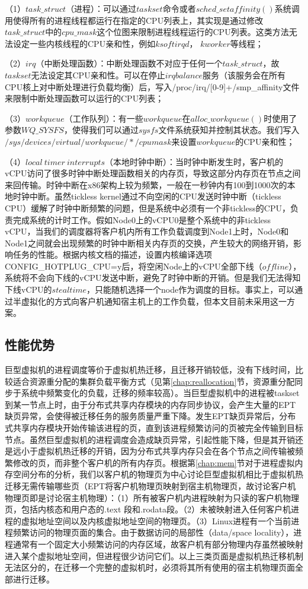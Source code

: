 （1）$task\_struct$（进程）：可以通过$taskset$命令或者$sched\_setaffinity()$系统调用使得所有的进程线程都运行在指定的CPU列表上，其实现是通过修改$task\_struct$中的$cpu\_mask$这个位图来限制进程线程运行的CPU列表。这类方法无法设定一些内核线程的CPU亲和性，例如$ksoftirqd$， $kworker$等线程；

（2）$irq$（中断处理函数）：中断处理函数不对应于任何一个$task\_struct$，故$taskset$无法设定其CPU亲和性。可以在停止$irqbalance$服务（该服务会在所有CPU核上对中断处理进行负载均衡）后，写入/proc/irq/[0-9]+/smp\_affinity文件来限制中断处理函数可以运行的CPU列表；

（3）$workqueue$（工作队列）：有一些$workqueue$在$alloc\_workqueue()$时使用了参数$WQ\_SYSFS$，使得我们可以通过$sysfs$文件系统获知并控制其状态。我们写入$/sys/devices/virtual/workqueue/*/cpumask$来设置$workqueue$的CPU亲和性；

（4）$local\ timer\ interrupts$（本地时钟中断）：当时钟中断发生时，客户机的vCPU访问了很多时钟中断处理函数相关的内存页，导致这部分内存页在节点之间来回传输。时钟中断在x86架构上较为频繁，一般在一秒钟内有100到1000次的本地时钟中断。虽然tickless kernel通过不向空闲的CPU发送时钟中断（tickless CPU）缓解了时钟中断频繁的问题，但是系统中必须有一个非tickless的CPU，负责完成系统的计时工作。假如Node0上的vCPU0是整个系统中的非tickless vCPU，当我们的调度器将客户机内所有工作负载调度到Node1上时，Node0和Node1之间就会出现频繁的时钟中断相关内存页的交换，产生较大的网络开销，影响任务的性能。根据内核文档的描述，设置内核编译选项CONFIG\_HOTPLUG\_CPU=y后，将空闲Node上的vCPU全部下线（$offline$），系统将不会向下线的vCPU发送中断，避免了时钟中断的开销。但是我们无法得知下线vCPU的$steal time$，只能随机选择一个node作为调度的目标。事实上，可以通过半虚拟化的方式向客户机通知宿主机上的工作负载，但本文目前未采用这一方案。

\subsection{性能优势}
巨型虚拟机的进程调度等价于虚拟机热迁移，且迁移开销较低，没有下线时间，比较适合资源重分配的集群负载平衡方式（见第\ref{chap:reallocation}节，资源重分配同步于系统中频繁变化的负载，迁移的频率较高）。当巨型虚拟机中的进程被taskset到某一节点上时，由于分布式共享内存模块的内存同步协议，会产生大量的EPT缺页异常，会使得被迁移任务的服务质量严重下降。发生EPT缺页异常后，分布式共享内存模块开始传输该进程的页，直到该进程频繁访问的页被完全传输到目标节点。虽然巨型虚拟机的进程调度会造成缺页异常，引起性能下降，但是其开销还是远小于虚拟机热迁移的开销，因为分布式共享内存只会在各个节点之间传输被频繁修改的页，而非整个客户机的所有内存页。根据第\ref{chap:mem}节对于进程虚拟内存空间分布的分析，我们以客户机的物理页为中心讨论巨型虚拟机相比于虚拟机热迁移无需传输哪些页（EPT将客户机物理页映射到宿主机物理页，故讨论客户机物理页即是讨论宿主机物理）：（1）所有被客户机内进程映射为只读的客户机物理页，包括内核态和用户态的.text 段和.rodata段。（2）未被映射进入任何客户机进程的虚拟地址空间以及内核虚拟地址空间的物理页。（3）Linux进程有一个当前进程频繁访问的物理页面的集合。由于数据访问的局部性（data/space locality），进程通常有一个固定大小频繁访问的内存区域，故客户机有部分物理内存虽然被映射进入某个虚拟地址空间，但进程很少访问它们。以上三类页面是虚拟机热迁移机制无法区分的，在迁移一个完整的虚拟机时，必须将其所有使用的宿主机物理页面全部进行迁移。

